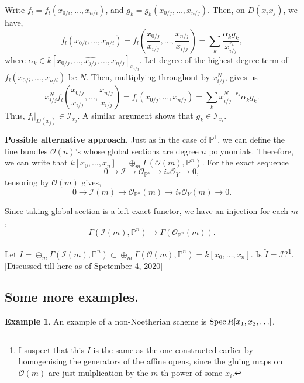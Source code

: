 \documentclass[11pt]{amsart}
\newcommand{\Spec}{{\rm Spec \,}}
\renewcommand{\tilde}{\widetilde}
\newcommand{\sI}{{\mathcal I}}
\newcommand{\sO}{{\mathcal O}}
\renewcommand{\P}{{\mathbb P}}
\theoremstyle{definition}
\newtheorem{example}[theorem]{Example}
\begin{document}
Write $f_l=f_l(x_{0/i},\ldots,x_{n/i})$, and $g_k=g_k(x_{0/j},\ldots,x_{n/j})$. Then, on $D(x_i x_j)$, we have,
\[f_l(x_{0/i},\ldots,x_{n/i})=f_l(\frac{x_{0/j}}{x_{i/j}},\ldots,\frac{x_{n/j}}{x_{i/j}})=\sum_k \frac{\alpha_k g_k}{x_{i/j}^{r_k}},\]
where $\alpha_k\in k[x_{0/j},\ldots,\widehat{x_{j/j}},\ldots,x_{n/j}]_{x_{i/j}}$. Let degree of the highest degree term of $f_l(x_{0/i},\ldots,x_{n/i})$ be $N$. Then, multiplying throughout by $x_{i/j}^N$, gives us
\[x_{i/j}^N f_l(\frac{x_{0/j}}{x_{i/j}},\ldots,\frac{x_{n/j}}{x_{i/j}})= f_l(x_{0/j},\ldots,x_{n/j})=\sum_k  x_{i/j}^{N-r_k} \alpha_k g_k.\]
Thus, $f_l|_{D(x_j)}\in \sI_{x_j}$. A similar argument shows that $g_k\in \sI_{x_i}$.

\noindent\textbf{Possible alternative approach.} Just as in the case of $\P^1$, we can define the line bundles $\sO(n)$'s whose global sections are degree $n$ polynomials. Therefore, we can write that $k[x_0,\ldots,x_n]=\oplus_m\Gamma (\sO(m),\P^n)$. For the exact sequence
\[0\rightarrow \sI\rightarrow \sO_{\P^n}\rightarrow i_*\sO_Y\rightarrow 0,\]
tensoring by $\sO(m)$ gives,
\[0\rightarrow \sI(m)\rightarrow \sO_{\P^n}(m)\rightarrow i_*\sO_Y(m)\rightarrow 0.\]

Since taking global section is a left exact functor, we have an injection for each $m$,
\[\Gamma (\sI(m),\P^n)\rightarrow \Gamma (\sO_{\P^n}(m)).\]

Let $I=\oplus_m \Gamma (\sI(m),\P^n)\subset \oplus_m\Gamma (\sO(m),\P^n) = k[x_0,\ldots,x_n]$. Is $\tilde{I}=\sI$?\footnote{I suspect that this $I$ is the same as the one constructed earlier by homogenising the generators of the affine opens, since the gluing maps on $\sO(m)$ are just mulplication by the $m$-th power of some $x_i$.}. [Discussed till here as of Spetember 4, 2020]

\subsection{Some more examples.}

\begin{example}
An example of a non-Noetherian scheme is $\Spec R[x_1,x_2,\ldots]$. 
\end{example}
\end{document}
